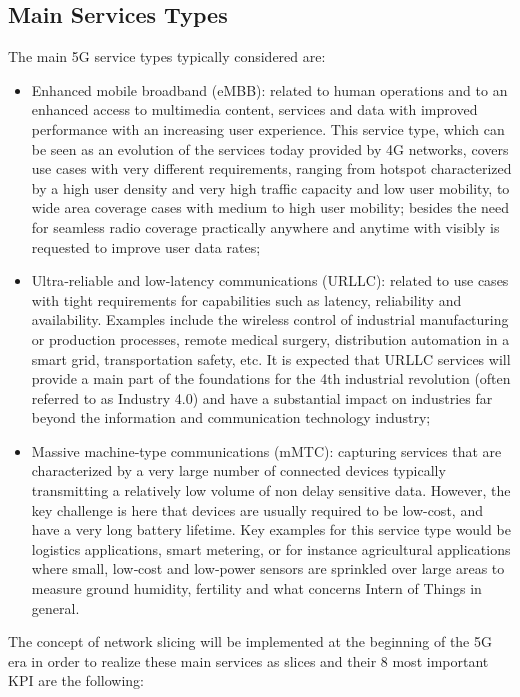 \documentclass[a4paper,12pt]{report} %
\begin{document}
\subsection{Main Services Types}
The main 5G service types typically considered are:
\begin{itemize}
\item Enhanced mobile broadband (eMBB): related to human operations and to an enhanced access to multimedia content, services and data with improved performance with an increasing user experience. This service type, which can be seen as an evolution of the services today provided by
4G networks, covers use cases with very different requirements, ranging from hotspot characterized by a high user density and very high traffic capacity and low user mobility, to wide area coverage cases with medium to high user mobility; besides the need for seamless radio coverage practically
anywhere and anytime with visibly is requested to improve user data rates;
\end{itemize}
\begin{itemize}
\item Ultra‐reliable and low-latency communications (URLLC): related to use cases with tight requirements for capabilities such as latency, reliability and availability. Examples include the wireless
control of industrial manufacturing or production processes, remote medical surgery, distribution automation in a smart grid, transportation safety, etc. It is expected that URLLC services will provide a main part of the foundations for the 4th industrial revolution (often referred to as
Industry 4.0) and have a substantial impact on industries far beyond the information and communication technology industry;
\end{itemize}
\begin{itemize}
\item Massive machine‐type communications (mMTC): capturing services that are characterized by
a very large number of connected devices typically transmitting a relatively low volume of non delay sensitive data. However, the key challenge is here that devices are usually required to be
low-cost, and have a very long battery lifetime. Key examples for this service type would be logistics applications, smart metering, or for instance
agricultural applications where small, low‐cost and low‐power sensors are sprinkled over large
areas to measure ground humidity, fertility and what concerns Intern of Things in general.
\end{itemize}
The concept of network slicing will be implemented at the beginning of the 5G era in order to realize these main services as slices and their 8 most important KPI are the following:
\end{document}
